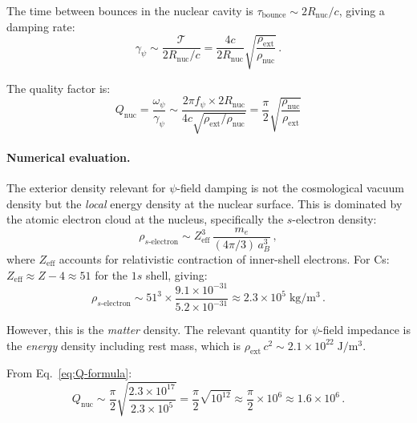 \documentclass[aps,prd,twocolumn,superscriptaddress,nofootinbib]{revtex4-2}
\newcommand{\ee}[1]{\times 10^{#1}}
\newcommand{\Qnuc}{Q_{\mathrm{nuc}}}
\newcommand{\wpsi}{\omega_\psi}
\newcommand{\gpsi}{\gamma_\psi}
\newcommand{\Rnuc}{R_{\mathrm{nuc}}}
\newcommand{\fpsi}{f_\psi}
\begin{document}
The time between bounces in the nuclear cavity is
$\tau_{\mathrm{bounce}} \sim 2\Rnuc/c$, giving a damping rate:
\begin{equation}\label{eq:gamma-psi}
\gpsi \sim \frac{\mathcal{T}}{2\Rnuc/c}
= \frac{4c}{2\Rnuc}\sqrt{\frac{\rho_{\mathrm{ext}}}{\rho_{\mathrm{nuc}}}}\,.
\end{equation}

The quality factor is:
\begin{equation}\label{eq:Q-formula}
\boxed{
\Qnuc = \frac{\wpsi}{\gpsi}
\sim \frac{2\pi\fpsi \times 2\Rnuc}{4c\sqrt{\rho_{\mathrm{ext}}/\rho_{\mathrm{nuc}}}}
= \frac{\pi}{2}\sqrt{\frac{\rho_{\mathrm{nuc}}}{\rho_{\mathrm{ext}}}}
}
\end{equation}

\paragraph{Numerical evaluation.}
The exterior density relevant for $\psi$-field damping is not the
cosmological vacuum density but the \emph{local} energy density at
the nuclear surface.  This is dominated by the atomic electron cloud
at the nucleus, specifically the $s$-electron density:
\begin{equation}
\rho_{s\text{-electron}} \sim Z_{\mathrm{eff}}^3\,
\frac{m_e}{(4\pi/3)\,a_B^3}\,,
\end{equation}
where $Z_{\mathrm{eff}}$ accounts for relativistic contraction of
inner-shell electrons.  For Cs: $Z_{\mathrm{eff}} \approx Z - 4
\approx 51$ for the $1s$ shell, giving:
\begin{equation}
\rho_{s\text{-electron}} \sim 51^3 \times \frac{9.1\ee{-31}}
{5.2\ee{-31}} \approx 2.3\ee{5}\;\mathrm{kg/m^3}\,.
\end{equation}

However, this is the \emph{matter} density.  The relevant quantity
for $\psi$-field impedance is the \emph{energy} density including
rest mass, which is $\rho_{\mathrm{ext}}\,c^2 \sim 2.1\ee{22}\;
\mathrm{J/m^3}$.

From Eq.~\eqref{eq:Q-formula}:
\begin{equation}\label{eq:Q-numerical}
\Qnuc \sim \frac{\pi}{2}\sqrt{\frac{2.3\ee{17}}{2.3\ee{5}}}
= \frac{\pi}{2}\sqrt{10^{12}} \approx \frac{\pi}{2}\times 10^6
\approx 1.6\ee{6}\,.
\end{equation}
\end{document}
